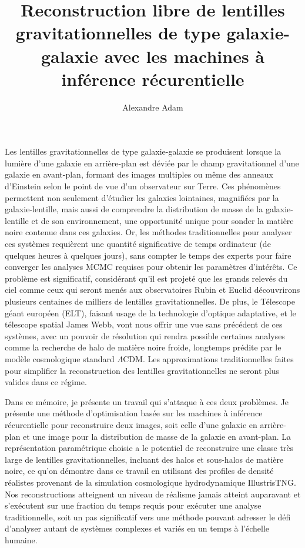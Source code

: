 \documentclass[
  normalmargins,
  11pt,
  openany,
  onehalfspacing,
]{ut-thesis}
\author{Alexandre Adam}
\title{Reconstruction libre de lentilles gravitationnelles de type galaxie-galaxie avec les machines à inférence récurentielle}
\begin{document}
  \frontmatter
    \maketitle


    \begin{resume}
	Les lentilles gravitationnelles de type galaxie-galaxie se produisent lorsque la lumière d'une galaxie 
	en arrière-plan est déviée par le champ gravitationnel d'une galaxie en avant-plan, formant 
	des images multiples ou même des anneaux d'Einstein selon le point de vue d'un observateur sur Terre. 
	Ces phénomènes permettent non seulement 
	d'étudier les galaxies lointaines, magnifiées par la galaxie-lentille, mais aussi de comprendre la distribution 
	de masse de la galaxie-lentille et de son environnement, une opportunité unique pour 
	sonder la matière noire contenue dans ces galaxies. 
	Or, les méthodes traditionnelles pour analyser ces systèmes requièrent une quantité 
	significative de temps ordinateur (de quelques heures à quelques jours), sans compter le temps des 
	experts pour faire converger les analyses MCMC requises pour obtenir les paramètres d'intérêts. 
	Ce problème est significatif, considérant qu'il est projeté que  
	les grands relevés du ciel comme ceux qui seront menés aux observatoires Rubin et Euclid découvrirons plusieurs 
	centaines de milliers de lentilles gravitationnelles.  
	De plus, le Télescope géant européen (ELT), faisant usage de la technologie d'optique adaptative, 
	et le télescope spatial James Webb, vont nous offrir une vue sans précédent de ces systèmes, avec un 
	pouvoir de résolution qui rendra possible certaines analyses comme la recherche de halo de matière noire froide, 
	longtemps prédite par le modèle cosmologique standard $\Lambda$CDM. Les approximations traditionnelles faites pour 
	simplifier la reconstruction des lentilles gravitationnelles ne seront plus valides dans ce régime.

	Dans ce mémoire, je présente un travail qui s'attaque à ces deux problèmes. Je présente une 
	méthode d'optimisation basée sur les machines à inférence récurentielle pour reconstruire 
	deux images, soit celle d'une galaxie en arrière-plan et une image pour la distribution de masse 
	de la galaxie en avant-plan. La représentation paramétrique choisie a le potentiel de reconstruire 
	une classe très large de lentilles gravitationnelles, incluant des halos et sous-halos de matière noire, 
	ce qu'on démontre dans ce travail en utilisant des profiles de densité réalistes provenant de 
	la simulation cosmologique hydrodynamique IllustrisTNG. 
	Nos reconstructions atteignent un niveau de réalisme jamais atteint auparavant 
        et s'exécutent sur une fraction du temps requis pour exécuter une analyse traditionnelle, soit un pas 
	significatif vers une méthode pouvant adresser le défi d'analyser autant de systèmes complexes et variés en 
	un temps à l'échelle humaine.

    \end{resume}
\end{document}
